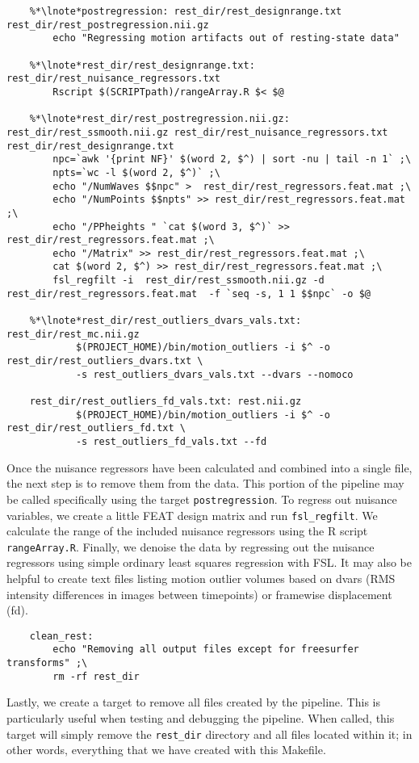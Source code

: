 \begin{lstlisting}
	%*\lnote*postregression: rest_dir/rest_designrange.txt rest_dir/rest_postregression.nii.gz
		echo "Regressing motion artifacts out of resting-state data"

	%*\lnote*rest_dir/rest_designrange.txt: rest_dir/rest_nuisance_regressors.txt
		Rscript $(SCRIPTpath)/rangeArray.R $< $@

	%*\lnote*rest_dir/rest_postregression.nii.gz: rest_dir/rest_ssmooth.nii.gz rest_dir/rest_nuisance_regressors.txt rest_dir/rest_designrange.txt
		npc=`awk '{print NF}' $(word 2, $^) | sort -nu | tail -n 1` ;\
		npts=`wc -l $(word 2, $^)` ;\
		echo "/NumWaves $$npc" >  rest_dir/rest_regressors.feat.mat ;\
		echo "/NumPoints $$npts" >> rest_dir/rest_regressors.feat.mat ;\
		echo "/PPheights " `cat $(word 3, $^)` >> rest_dir/rest_regressors.feat.mat ;\
		echo "/Matrix" >> rest_dir/rest_regressors.feat.mat ;\
		cat $(word 2, $^) >> rest_dir/rest_regressors.feat.mat ;\
		fsl_regfilt -i  rest_dir/rest_ssmooth.nii.gz -d rest_dir/rest_regressors.feat.mat  -f `seq -s, 1 1 $$npc` -o $@
		
	%*\lnote*rest_dir/rest_outliers_dvars_vals.txt: rest_dir/rest_mc.nii.gz
			$(PROJECT_HOME)/bin/motion_outliers -i $^ -o rest_dir/rest_outliers_dvars.txt \
			-s rest_outliers_dvars_vals.txt --dvars --nomoco
		
	rest_dir/rest_outliers_fd_vals.txt: rest.nii.gz
			$(PROJECT_HOME)/bin/motion_outliers -i $^ -o rest_dir/rest_outliers_fd.txt \
			-s rest_outliers_fd_vals.txt --fd
\end{lstlisting}

Once the nuisance regressors have been calculated and combined into a single file, the next step is to remove them from the data.  This portion of the pipeline may be called specifically using the target \texttt{postregression}.  To regress out nuisance variables, we create a little FEAT design matrix and run \texttt{fsl_regfilt}. We calculate the range of the included nuisance regressors using the R script \texttt{rangeArray.R}.  Finally, we denoise the data by regressing out the nuisance regressors using simple ordinary least squares regression with FSL.  It may also be helpful to create text files listing motion outlier volumes based on dvars (RMS intensity differences in images between timepoints) or framewise displacement (fd). 

\begin{lstlisting}
	clean_rest:
		echo "Removing all output files except for freesurfer transforms" ;\
		rm -rf rest_dir
\end{lstlisting}

Lastly, we create a target to remove all files created by the pipeline. This is particularly useful when testing and debugging the pipeline. When called, this target will simply remove the \texttt{rest_dir} directory and all files located within it; in other words, everything that we have created with this Makefile.


